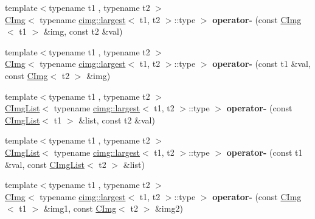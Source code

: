 \begin{DoxyCompactItemize}
\item 
\hypertarget{namespacecimg__library_ae1b6258e73501cf6ae5ebf1faf7b41c4}{
{\footnotesize template$<$typename t1 , typename t2 $>$ }\\\hyperlink{structcimg__library_1_1_c_img}{CImg}$<$ typename \hyperlink{structcimg__library_1_1cimg_1_1largest}{cimg::largest}$<$ t1, t2 $>$::type $>$ {\bfseries operator-\/} (const \hyperlink{structcimg__library_1_1_c_img}{CImg}$<$ t1 $>$ \&img, const t2 \&val)}
\label{namespacecimg__library_ae1b6258e73501cf6ae5ebf1faf7b41c4}

\item 
\hypertarget{namespacecimg__library_a587510bfb45fe4c2575e52afb4546a90}{
{\footnotesize template$<$typename t1 , typename t2 $>$ }\\\hyperlink{structcimg__library_1_1_c_img}{CImg}$<$ typename \hyperlink{structcimg__library_1_1cimg_1_1largest}{cimg::largest}$<$ t1, t2 $>$::type $>$ {\bfseries operator-\/} (const t1 \&val, const \hyperlink{structcimg__library_1_1_c_img}{CImg}$<$ t2 $>$ \&img)}
\label{namespacecimg__library_a587510bfb45fe4c2575e52afb4546a90}

\item 
\hypertarget{namespacecimg__library_a5daf5133251f869bd360f44ba8f1ec19}{
{\footnotesize template$<$typename t1 , typename t2 $>$ }\\\hyperlink{structcimg__library_1_1_c_img_list}{CImgList}$<$ typename \hyperlink{structcimg__library_1_1cimg_1_1largest}{cimg::largest}$<$ t1, t2 $>$::type $>$ {\bfseries operator-\/} (const \hyperlink{structcimg__library_1_1_c_img_list}{CImgList}$<$ t1 $>$ \&list, const t2 \&val)}
\label{namespacecimg__library_a5daf5133251f869bd360f44ba8f1ec19}

\item 
\hypertarget{namespacecimg__library_af8a8ac738acb365604ccfb9b9a8dc21e}{
{\footnotesize template$<$typename t1 , typename t2 $>$ }\\\hyperlink{structcimg__library_1_1_c_img_list}{CImgList}$<$ typename \hyperlink{structcimg__library_1_1cimg_1_1largest}{cimg::largest}$<$ t1, t2 $>$::type $>$ {\bfseries operator-\/} (const t1 \&val, const \hyperlink{structcimg__library_1_1_c_img_list}{CImgList}$<$ t2 $>$ \&list)}
\label{namespacecimg__library_af8a8ac738acb365604ccfb9b9a8dc21e}

\item 
\hypertarget{namespacecimg__library_aa6660a3b7f6acad3b6db20925757c126}{
{\footnotesize template$<$typename t1 , typename t2 $>$ }\\\hyperlink{structcimg__library_1_1_c_img}{CImg}$<$ typename \hyperlink{structcimg__library_1_1cimg_1_1largest}{cimg::largest}$<$ t1, t2 $>$::type $>$ {\bfseries operator-\/} (const \hyperlink{structcimg__library_1_1_c_img}{CImg}$<$ t1 $>$ \&img1, const \hyperlink{structcimg__library_1_1_c_img}{CImg}$<$ t2 $>$ \&img2)}
\label{namespacecimg__library_aa6660a3b7f6acad3b6db20925757c126}


\end{DoxyCompactItemize}
